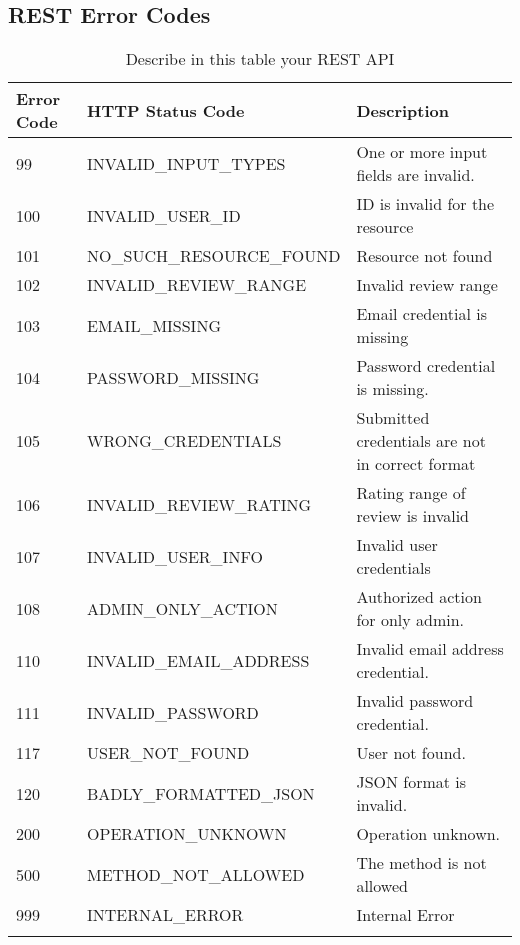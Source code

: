 \subsection{REST Error Codes}


\begin{longtable}{|p{}|p{} |p{}|} 
\hline
\textbf{Error Code} & \textbf{HTTP Status Code} & \textbf{Description} \\\hline

99 & INVALID\_INPUT\_TYPES & One or more input fields are invalid.\\\hline
100 & INVALID\_USER\_ID & ID is invalid for the resource\\\hline
101 & NO\_SUCH\_RESOURCE\_FOUND & Resource not found\\\hline
102 & INVALID\_REVIEW\_RANGE & Invalid review range\\\hline
103 & EMAIL\_MISSING & Email credential is missing\\\hline
104 & PASSWORD\_MISSING & Password credential is missing.\\\hline
105 & WRONG\_CREDENTIALS & Submitted credentials are not in correct format\\\hline
106 & INVALID\_REVIEW\_RATING & Rating range of review is invalid\\\hline
107 & INVALID\_USER\_INFO & Invalid user credentials\\\hline
108 & ADMIN\_ONLY\_ACTION & Authorized action for only admin.\\\hline
110 & INVALID\_EMAIL\_ADDRESS & Invalid email address credential.\\\hline
111 & INVALID\_PASSWORD & Invalid password credential.\\\hline
117 & USER\_NOT\_FOUND & User not found.\\\hline
120 & BADLY\_FORMATTED\_JSON & JSON format is invalid.\\\hline
200 & OPERATION\_UNKNOWN & Operation unknown.\\\hline
500 & METHOD\_NOT\_ALLOWED & The method is not allowed\\\hline
999 & INTERNAL\_ERROR & Internal Error\\\hline

\caption{Describe in this table your REST API}
\label{tab:termGlossary}
\end{longtable}